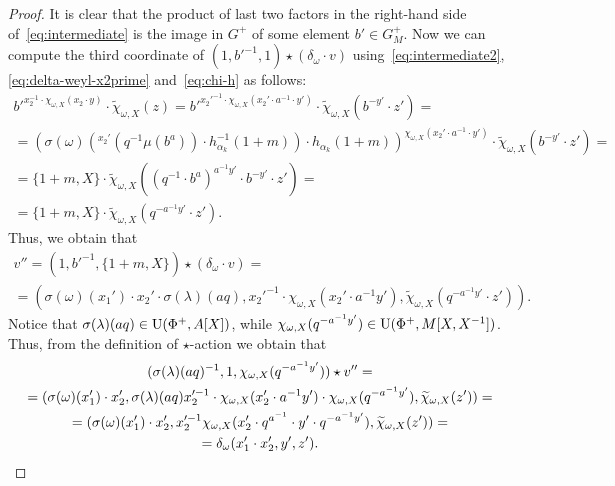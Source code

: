 \begin{cor}
\begin{proof}
It is clear that the product of last two factors in the right-hand side of~\eqref{eq:intermediate} is
 the image in $G^+$ of some element $b' \in G_M^+$.
Now we can compute the third coordinate of $(1, {b'}^{-1}, 1) \star (\delta_\omega \cdot v)$ using~\eqref{eq:intermediate2}, \eqref{eq:delta-weyl-x2prime} and~\eqref{eq:chi-h} as follows:
\begin{multline*}
 {b'}^{x_2^{-1} \cdot \chi_{\omega, X}(x_2 \cdot y) } \cdot \widetilde{\chi}_{\omega, X}(z) =
 {b'}^{{x_2'}^{-1} \cdot \chi_{\omega, X}(x_2' \cdot a^{-1} \cdot y') } \cdot \widetilde{\chi}_{\omega, X}(b^{-y'} \cdot z') = \\
 = \left(\sigma(\omega)\left( {}^{x_2'}(q^{-1} \mu(b^a)) \cdot h^{-1}_{\alpha_k}(1+m)\right) \cdot h_{\alpha_k}(1+m)\right)^{\chi_{\omega, X}(x_2' \cdot a^{-1} \cdot y')} \cdot \widetilde{\chi}_{\omega, X}(b^{-y'} \cdot z') = \\
 = \{1+m, X\} \cdot \widetilde{\chi}_{\omega, X}\left( \left( q^{-1} \cdot b^a \right)^{a^{-1}y'} \cdot b^{-y'} \cdot z' \right) = \\
 = \{1+m, X\} \cdot \widetilde{\chi}_{\omega, X}(q^{-a^{-1}y'} \cdot z').
\end{multline*}
Thus, we obtain that
\begin{multline*}
 v'' = (1, {b'}^{-1}, \{1 + m, X\}) \star (\delta_\omega \cdot v) = \\ =
  (\sigma(\omega)(x_1') \cdot x_2' \cdot \sigma(\lambda)(aq), x_2'^{-1} \cdot \chi_{\omega, X}(x_2' \cdot a^{-1} y'), \widetilde{\chi}_{\omega, X}(q^{-a^{-1}y'} \cdot z')).
\end{multline*}
Notice that $\sigma(\lambda)(aq) \in \operatorname{U}(\Phi^+, A[X])$, while $\chi_{\omega, X}(q^{-a^{-1}y'})\in \operatorname{U}(\Phi^+, M[X, X^{-1}])$.
Thus, from the definition of $\star$-action we obtain that
\begin{multline*}
 (\sigma(\lambda)(aq)^{-1}, 1, \chi_{\omega, X}(q^{-a^{-1}y'})) \star v'' = \\
 = (\sigma(\omega)(x_1') \cdot x_2', \sigma(\lambda)(aq) x_2'^{-1} \cdot \chi_{\omega, X}(x_2' \cdot a^{-1} y') \cdot \chi_{\omega, X}(q^{-a^{-1}y'}), \widetilde{\chi}_{\omega, X}(z')) = \\
 = (\sigma(\omega)(x_1') \cdot x_2', x_2'^{-1} \chi_{\omega, X}(x_2' \cdot q^{a^{-1}} \cdot y' \cdot q^{-a^{-1}y'}), \widetilde{\chi}_{\omega, X}(z')) = \\
    = \delta_\omega (x_1' \cdot x_2', y', z'). \qedhere
\end{multline*}
 \end{proof}


\end{cor}
